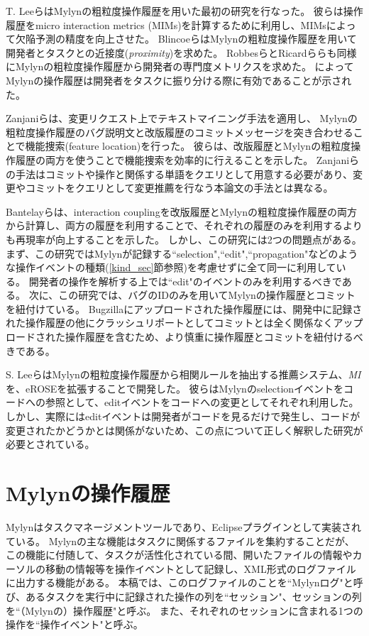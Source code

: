 \documentclass[a4paper]{jsbook}
\begin{document}
T. Leeら\cite{TLee:2011}はMylynの粗粒度操作履歴を用いた最初の研究を行なった。
彼らは操作履歴をmicro interaction metrics (MIMs)を計算するために利用し、MIMsによって欠陥予測の精度を向上させた。
Blincoeら\cite{Blincoe:2012}はMylynの粗粒度操作履歴を用いて開発者とタスクとの近接度({\it proximity})を求めた。
Robbesら\cite{Robbes:2013}とRicardら\cite{Silva:2015}らも同様にMylynの粗粒度操作履歴から開発者の専門度メトリクスを求めた。
\cite{Blincoe:2012,Robbes:2013,Silva:2015}によってMylynの操作履歴は開発者をタスクに振り分ける際に有効であることが示された。

Zanjaniら\cite{Zanjani:2014}は、変更リクエスト上でテキストマイニング手法を適用し、
Mylynの粗粒度操作履歴のバグ説明文と改版履歴のコミットメッセージを突き合わせることで機能捜索(feature location)を行った。
彼らは、改版履歴とMylynの粗粒度操作履歴の両方を使うことで機能捜索を効率的に行えることを示した。
Zanjaniらの手法はコミットや操作と関係する単語をクエリとして用意する必要があり、変更やコミットをクエリとして変更推薦を行なう本論文の手法とは異なる。

Bantelayら\cite{Bantelay:2013}は、interaction couplingを改版履歴とMylynの粗粒度操作履歴の両方から計算し、両方の履歴を利用することで、それぞれの履歴のみを利用するよりも再現率が向上することを示した。
しかし、この研究には2つの問題点がある。
まず、この研究ではMylynが記録する``selection",``edit",``propagation"などのような操作イベントの種類(\ref{kind_sec}節参照)を考慮せずに全て同一に利用している。
開発者の操作を解析する上では``edit"のイベントのみを利用するべきである。
次に、この研究では、バグのIDのみを用いてMylynの操作履歴とコミットを紐付けている。
Bugzillaにアップロードされた操作履歴には、開発中に記録された操作履歴の他にクラッシュリポートとしてコミットとは全く関係なくアップロードされた操作履歴を含むため、より慎重に操作履歴とコミットを紐付けるべきである。

S. Leeら\cite{SLee:2015}はMylynの粗粒度操作履歴から相関ルールを抽出する推薦システム、{\it MI}を、eROSE\cite{Zimmermann:2005}を拡張することで開発した。
彼らはMylynのselectionイベントをコードへの参照として、editイベントをコードへの変更としてそれぞれ利用した。
しかし、実際にはeditイベントは開発者がコードを見るだけで発生し、コードが変更されたかどうかとは関係がないため、この点について正しく解釈した研究が必要とされている。

\chapter{Mylynの操作履歴}\label{mylyn_chap}
Mylyn\cite{Kersten:2005}はタスクマネージメントツールであり、Eclipseプラグインとして実装されている。
Mylynの主な機能はタスクに関係するファイルを集約することだが、この機能に付随して、タスクが活性化されている間、開いたファイルの情報やカーソルの移動の情報等を操作イベントとして記録し、XML形式のログファイルに出力する機能がある。
本稿では、このログファイルのことを``Mylynログ"と呼び、あるタスクを実行中に記録された操作の列を``セッション"、セッションの列を``（Mylynの）操作履歴"と呼ぶ。
また、それぞれのセッションに含まれる1つの操作を``操作イベント"と呼ぶ。
\end{document}
